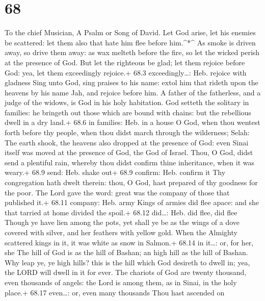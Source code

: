 \hypertarget{section-67}{%
\section{68}\label{section-67}}

To the chief Musician, A Psalm or Song of David.  Let God
arise, let his enemies be scattered: let them also that hate him flee
before him.\^{}*\^{}  As smoke is driven away, so drive them
away: as wax melteth before the fire, so let the wicked perish at the
presence of God.  But let the righteous be glad; let them
rejoice before God: yea, let them exceedingly rejoice.+ 68.3
exceedingly\ldots: Heb. rejoice with gladness  Sing unto
God, sing praises to his name: extol him that rideth upon the heavens by
his name Jah, and rejoice before him.  A father of the
fatherless, and a judge of the widows, is God in his holy habitation.
 God setteth the solitary in families: he bringeth out those
which are bound with chains: but the rebellious dwell in a dry land.+
68.6 in families: Heb. in a house  O God, when thou wentest
forth before thy people, when thou didst march through the wilderness;
Selah:  The earth shook, the heavens also dropped at the
presence of God: even Sinai itself was moved at the presence of God, the
God of Israel.  Thou, O God, didst send a plentiful rain,
whereby thou didst confirm thine inheritance, when it was weary.+ 68.9
send: Heb. shake out+ 68.9 confirm: Heb. confirm it  Thy
congregation hath dwelt therein: thou, O God, hast prepared of thy
goodness for the poor.  The Lord gave the word: great was
the company of those that published it.+ 68.11 company: Heb. army
 Kings of armies did flee apace: and she that tarried at
home divided the spoil.+ 68.12 did\ldots: Heb. did flee, did flee
 Though ye have lien among the pots, yet shall ye be as the
wings of a dove covered with silver, and her feathers with yellow gold.
 When the Almighty scattered kings in it, it was white as
snow in Salmon.+ 68.14 in it\ldots: or, for her, she  The
hill of God is as the hill of Bashan; an high hill as the hill of
Bashan.  Why leap ye, ye high hills? this is the hill which
God desireth to dwell in; yea, the LORD will dwell in it for ever.
 The chariots of God are twenty thousand, even thousands of
angels: the Lord is among them, as in Sinai, in the holy place.+ 68.17
even\ldots: or, even many thousands  Thou hast ascended on
